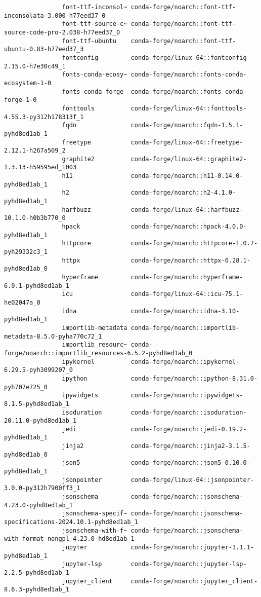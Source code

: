 \documentclass{article}
\begin{document}
\begin{itemize}
\begin{itemize}
\begin{itemize}
\begin{verbatim}
				font-ttf-inconsol~ conda-forge/noarch::font-ttf-inconsolata-3.000-h77eed37_0 
				font-ttf-source-c~ conda-forge/noarch::font-ttf-source-code-pro-2.038-h77eed37_0 
				font-ttf-ubuntu    conda-forge/noarch::font-ttf-ubuntu-0.83-h77eed37_3 
				fontconfig         conda-forge/linux-64::fontconfig-2.15.0-h7e30c49_1 
				fonts-conda-ecosy~ conda-forge/noarch::fonts-conda-ecosystem-1-0 
				fonts-conda-forge  conda-forge/noarch::fonts-conda-forge-1-0 
				fonttools          conda-forge/linux-64::fonttools-4.55.3-py312h178313f_1 
				fqdn               conda-forge/noarch::fqdn-1.5.1-pyhd8ed1ab_1 
				freetype           conda-forge/linux-64::freetype-2.12.1-h267a509_2 
				graphite2          conda-forge/linux-64::graphite2-1.3.13-h59595ed_1003 
				h11                conda-forge/noarch::h11-0.14.0-pyhd8ed1ab_1 
				h2                 conda-forge/noarch::h2-4.1.0-pyhd8ed1ab_1 
				harfbuzz           conda-forge/linux-64::harfbuzz-10.1.0-h0b3b770_0 
				hpack              conda-forge/noarch::hpack-4.0.0-pyhd8ed1ab_1 
				httpcore           conda-forge/noarch::httpcore-1.0.7-pyh29332c3_1 
				httpx              conda-forge/noarch::httpx-0.28.1-pyhd8ed1ab_0 
				hyperframe         conda-forge/noarch::hyperframe-6.0.1-pyhd8ed1ab_1 
				icu                conda-forge/linux-64::icu-75.1-he02047a_0 
				idna               conda-forge/noarch::idna-3.10-pyhd8ed1ab_1 
				importlib-metadata conda-forge/noarch::importlib-metadata-8.5.0-pyha770c72_1 
				importlib_resourc~ conda-forge/noarch::importlib_resources-6.5.2-pyhd8ed1ab_0 
				ipykernel          conda-forge/noarch::ipykernel-6.29.5-pyh3099207_0 
				ipython            conda-forge/noarch::ipython-8.31.0-pyh707e725_0 
				ipywidgets         conda-forge/noarch::ipywidgets-8.1.5-pyhd8ed1ab_1 
				isoduration        conda-forge/noarch::isoduration-20.11.0-pyhd8ed1ab_1 
				jedi               conda-forge/noarch::jedi-0.19.2-pyhd8ed1ab_1 
				jinja2             conda-forge/noarch::jinja2-3.1.5-pyhd8ed1ab_0 
				json5              conda-forge/noarch::json5-0.10.0-pyhd8ed1ab_1 
				jsonpointer        conda-forge/linux-64::jsonpointer-3.0.0-py312h7900ff3_1 
				jsonschema         conda-forge/noarch::jsonschema-4.23.0-pyhd8ed1ab_1 
				jsonschema-specif~ conda-forge/noarch::jsonschema-specifications-2024.10.1-pyhd8ed1ab_1 
				jsonschema-with-f~ conda-forge/noarch::jsonschema-with-format-nongpl-4.23.0-hd8ed1ab_1 
				jupyter            conda-forge/noarch::jupyter-1.1.1-pyhd8ed1ab_1 
				jupyter-lsp        conda-forge/noarch::jupyter-lsp-2.2.5-pyhd8ed1ab_1 
				jupyter_client     conda-forge/noarch::jupyter_client-8.6.3-pyhd8ed1ab_1 

\end{verbatim}
\end{itemize}
\end{itemize}
\end{itemize}
\end{document}
